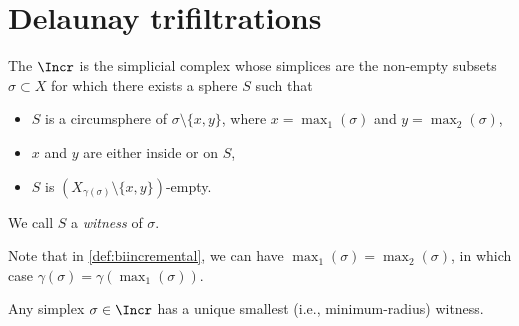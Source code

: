 \section{Delaunay trifiltrations} \label{sec:bifuncdel}
\begin{definition}\label{def:biincremental}
  The  $\Incr$ 
  is the simplicial complex whose simplices are the non-empty subsets $\sigma
  \subset X$ for which there exists a sphere $S$ such that 
    \begin{itemize}
    \item $S$ is a circumsphere of $\sigma \setminus
  \{x,y\}$, where $x=\max_1(\sigma)$ and $y=\max_2(\sigma)$,
        \item $x$ and $y$ are either inside or on $S$,
        \item $S$ is $(X_{\gamma(\sigma)}\setminus \{x,y\})$-empty.  %
    \end{itemize}
We call $S$ a \emph{witness} of $\sigma$.
\end{definition}
Note that in \cref{def:biincremental}, we can have $\max_1(\sigma)=\max_2(\sigma)$, in which case $\gamma(\sigma)=\gamma(\max_1(\sigma))$.
%
\begin{proposition}\label{Prop:Min_Rad_Witness}
Any simplex $\sigma\in \Incr$ has a unique smallest (i.e., minimum-radius) witness.
\end{proposition}
%
